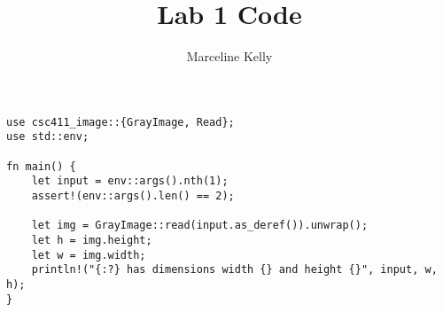 \documentclass[12pt, letterpaper]{article}
\title{Lab 1 Code}
\author{Marceline Kelly}
\date{}
\begin{document}
\maketitle

\begin{verbatim}
use csc411_image::{GrayImage, Read};
use std::env;

fn main() {
    let input = env::args().nth(1);
    assert!(env::args().len() == 2);

    let img = GrayImage::read(input.as_deref()).unwrap();
    let h = img.height;
    let w = img.width;
    println!("{:?} has dimensions width {} and height {}", input, w, h);
}    
\end{verbatim}
\end{document}
